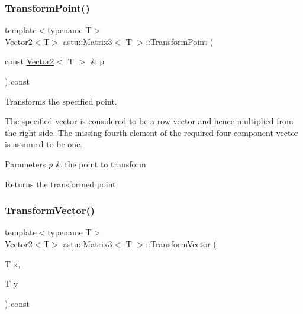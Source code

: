 \subsubsection{\texorpdfstring{Transform\+Point()}{TransformPoint()}\hspace{0.1cm}{\footnotesize\ttfamily [2/2]}}
{\footnotesize\ttfamily template$<$typename T$>$ \\
\hyperlink{classastu_1_1Vector2}{Vector2}$<$T$>$ \hyperlink{classastu_1_1Matrix3}{astu\+::\+Matrix3}$<$ T $>$\+::Transform\+Point (\begin{DoxyParamCaption}\item[{const \hyperlink{classastu_1_1Vector2}{Vector2}$<$ T $>$ \&}]{p }\end{DoxyParamCaption}) const\hspace{0.3cm}{\ttfamily [inline]}}

Transforms the specified point.

The specified vector is considered to be a row vector and hence multiplied from the right side. The missing fourth element of the required four component vector is assumed to be one.


\begin{DoxyParams}{Parameters}
{\em p} & the point to transform \\
\hline
\end{DoxyParams}
\begin{DoxyReturn}{Returns}
the transformed point 
\end{DoxyReturn}
\mbox{\label{classastu_1_1Matrix3_a8b3caf37d3ce5df9b7d7f42b5ec02cd4}} 
\subsubsection{\texorpdfstring{Transform\+Vector()}{TransformVector()}\hspace{0.1cm}{\footnotesize\ttfamily [1/2]}}
{\footnotesize\ttfamily template$<$typename T$>$ \\
\hyperlink{classastu_1_1Vector2}{Vector2}$<$T$>$ \hyperlink{classastu_1_1Matrix3}{astu\+::\+Matrix3}$<$ T $>$\+::Transform\+Vector (\begin{DoxyParamCaption}\item[{T}]{x,  }\item[{T}]{y }\end{DoxyParamCaption}) const\hspace{0.3cm}{\ttfamily [inline]}}

